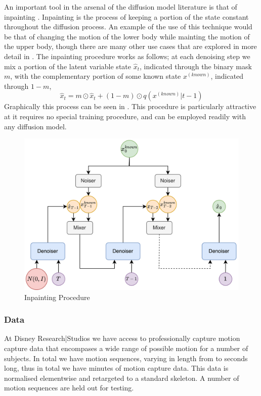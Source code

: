 An important tool in the arsenal of the diffusion model literature is that of inpainting \cite{diffusion_inpainting}. Inpainting is the process of keeping a portion of the state constant throughout the diffusion process. An example of the use of this technique would be that of changing the motion of the lower body while mainting the motion of the upper body, though there are many other use cases that are explored in more detail in . The inpainting procedure works as follows; at each denoising step we mix a portion of the latent variable state $\hat{x}_t$, indicated through the binary mask $m$, with the complementary portion of some known state $x^{(known)}$, indicated through $1-m$, 
\begin{equation}
    \hat{x}_{t} = m \odot \hat{x}_t + (1-m) \odot q(x^{(known)}|t-1)
\end{equation}
Graphically this process can be seen in . This procedure is particularly attractive at it requires no special training procedure, and can be employed readily with any diffusion model.

\begin{figure}[!ht]
    \centering
    \includegraphics[width=1\textwidth]{Figures/diffusion/Inpainting.png}
    \caption{Inpainting Procedure}
    \label{fig:inpainting}
\end{figure}


\subsubsection{Data}
At Disney Research|Studios we have access to professionally capture motion capture data that encompases a wide range of possible motion for a number of subjects. In total we have  motion sequences, varying in length from  to  seconds long, thus in total we have  minutes of motion capture data. This data is normalised elementwise and retargeted to a standard skeleton. A number of motion sequences are held out for testing.

